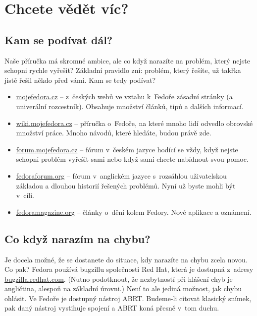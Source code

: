 \chapter*{Chcete vědět víc?}

\section*{Kam se podívat dál?}
Naše příručka má skromné ambice, ale co když narazíte na problém, který nejste schopni rychle vyřešit? Základní pravidlo zní: problém, který řešíte, už takřka jistě řešil někdo před vámi. Kam se tedy podívat?

\begin{itemize}
\item \url{mojefedora.cz} -- z~českých webů ve vztahu k~Fedoře zásadní stránky (a univerální rozcestník). Obsahuje množství článků, tipů a dalších informací.
\item \url{wiki.mojefedora.cz} -- příručka o~Fedoře, na které mnoho lidí odvedlo obrovské množství práce. Mnoho návodů, které hledáte, budou právě zde.
\item \url{forum.mojefedora.cz} -- fórum v~českém jazyce hodící se vždy, když nejste schopni problém vyřešit sami nebo když sami chcete nabídnout svou pomoc.
\item \url{fedoraforum.org} -- fórum v~anglickém jazyce s~rozsáhlou uživatelskou základou a dlouhou historií řešených problémů. Nyní už byste mohli být v~cíli.
\item \url{fedoramagazine.org} -- články o~dění kolem Fedory. Nové aplikace a oznámení.
\end{itemize}

\section*{Co když narazím na chybu?}
Je docela možné, že se dostanete do situace, kdy narazíte na chybu zcela novou. Co pak? Fedora používá bugzillu společnosti Red Hat, která je dostupná z~adresy \url{bugzilla.redhat.com}. (Nutno podotknout, že nezbytností při hlášení chyb je angličtina, alespoň na základní úrovni.) Není to ale jediná možnost, jak chybu ohlásit. Ve Fedoře je dostupný nástroj ABRT. Budeme-li citovat klasický snímek, pak daný nástroj vystihuje spojení \emph{} a ABRT koná přesně v~tom duchu.

